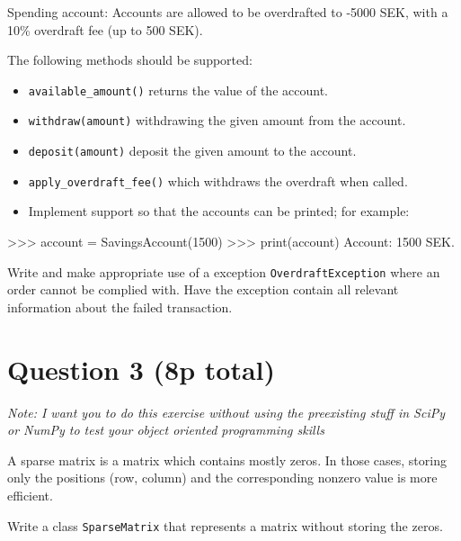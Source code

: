 \documentclass[]{article}
\newenvironment{Shaded}{}{}
\newcommand{\DataTypeTok}[1]{\textcolor[rgb]{0.56,0.13,0.00}{{#1}}}
\newcommand{\DecValTok}[1]{\textcolor[rgb]{0.25,0.63,0.44}{{#1}}}
\newcommand{\NormalTok}[1]{{#1}}
\begin{document}
Spending account: Accounts are allowed to be overdrafted to -5000 SEK,
with a 10\% overdraft fee (up to 500 SEK).

The following methods should be supported:

\begin{itemize}
\itemsep1pt\parskip0pt
\item
  \texttt{available\_amount()} returns the value of the account.
\item
  \texttt{withdraw(amount)} withdrawing the given amount from the
  account.
\item
  \texttt{deposit(amount)} deposit the given amount to the account.
\item
  \texttt{apply\_overdraft\_fee()} which withdraws the overdraft when
  called.
\item
  Implement support so that the accounts can be printed; for example:
\end{itemize}

\begin{Shaded}
\begin{Highlighting}[]
\NormalTok{>>> account = SavingsAccount(}\DecValTok{1500}\NormalTok{)}
\NormalTok{>>> }\DataTypeTok{print}\NormalTok{(account)}
\NormalTok{Account: }\DecValTok{1500} \NormalTok{SEK.}
\end{Highlighting}
\end{Shaded}

Write and make appropriate use of a exception
\texttt{OverdraftException} where an order cannot be complied with. Have
the exception contain all relevant information about the failed
transaction.

\section{Question 3 (8p total)}\label{question-3-8p-total}

\emph{Note: I want you to do this exercise without using the preexisting
stuff in SciPy or NumPy to test your object oriented programming skills}

A sparse matrix is a matrix which contains mostly zeros. In those cases,
storing only the positions (row, column) and the corresponding nonzero
value is more efficient.

Write a class \texttt{SparseMatrix} that represents a matrix without
storing the zeros.
\end{document}
